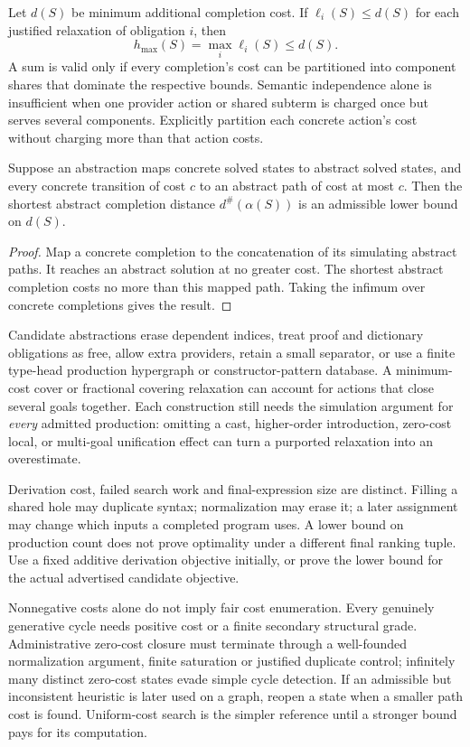 Let $d(S)$ be minimum additional completion cost. If $\ell_i(S)\le d(S)$
for each justified relaxation of obligation $i$, then
\[
 h_{\max}(S)=\max_i\ell_i(S)\le d(S).
\]
A sum is valid only if every completion's cost can be partitioned into
component shares that dominate the respective bounds. Semantic independence
alone is insufficient when one provider action or shared subterm is charged
once but serves several components. Explicitly partition each concrete
action's cost without charging more than that action costs.

\begin{proposition}
\label{prop:search-abstract-bound}
Suppose an abstraction maps concrete solved states to abstract solved states,
and every concrete transition of cost $c$ to an abstract path of cost at most
$c$. Then the shortest abstract completion distance
$d^{\#}(\alpha(S))$ is an admissible lower bound on $d(S)$.
\end{proposition}
\begin{proof}
Map a concrete completion to the concatenation of its simulating abstract
paths. It reaches an abstract solution at no greater cost. The shortest
abstract completion costs no more than this mapped path. Taking the infimum
over concrete completions gives the result.
\end{proof}

Candidate abstractions erase dependent indices, treat proof and dictionary
obligations as free, allow extra providers, retain a small separator, or use a
finite type-head production hypergraph or constructor-pattern database. A
minimum-cost cover or fractional covering relaxation can account for actions
that close several goals together. Each construction still needs the
simulation argument for \emph{every} admitted production: omitting a cast,
higher-order introduction, zero-cost local, or multi-goal unification effect
can turn a purported relaxation into an overestimate.

Derivation cost, failed search work and final-expression size are distinct.
Filling a shared hole may duplicate syntax; normalization may erase it; a
later assignment may change which inputs a completed program uses. A lower
bound on production count does not prove optimality under a different final
ranking tuple. Use a fixed additive derivation objective initially, or prove
the lower bound for the actual advertised candidate objective.

Nonnegative costs alone do not imply fair cost enumeration. Every genuinely
generative cycle needs positive cost or a finite secondary structural grade.
Administrative zero-cost closure must terminate through a well-founded
normalization argument, finite saturation or justified duplicate control;
infinitely many distinct zero-cost states evade simple cycle detection. If
an admissible but inconsistent heuristic is later used on a graph, reopen a
state when a smaller path cost is found. Uniform-cost search is the simpler
reference until a stronger bound pays for its computation.

